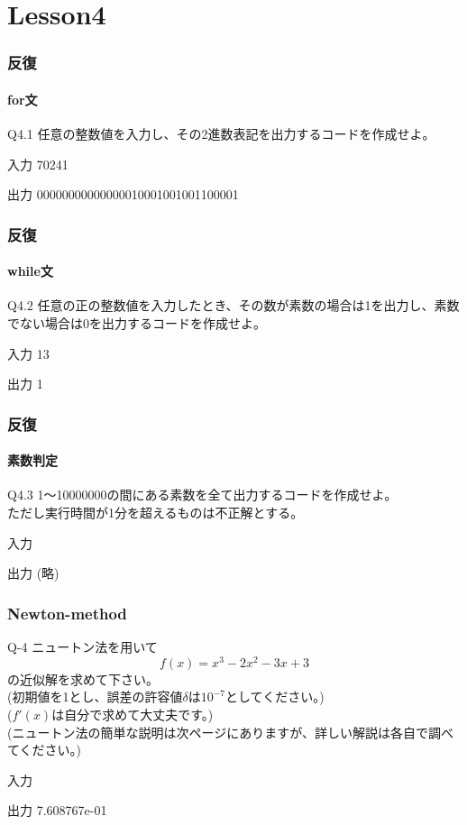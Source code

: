\documentclass[dvipdfmx]{beamer}
\begin{document}
\section{Lesson4}
\begin{frame}
    \frametitle{反復}
    \framesubtitle{for文}
	\begin{itembox}[l]{Q4.1}
        任意の整数値を入力し、その2進数表記を出力するコードを作成せよ。
	\end{itembox}
	\begin{block}{入力}
        70241
	\end{block}
	\begin{block}{出力}
        00000000000000010001001001100001
	\end{block}
\end{frame}

\begin{frame}
    \frametitle{反復}
    \framesubtitle{while文}
	\begin{itembox}[l]{Q4.2}
        任意の正の整数値を入力したとき、その数が素数の場合は1を出力し、素数でない場合は0を出力するコードを作成せよ。
	\end{itembox}
	\begin{block}{入力}
        13
	\end{block}
	\begin{block}{出力}
        1
	\end{block}
\end{frame}

\begin{frame}
    \frametitle{反復}
    \framesubtitle{素数判定}
	\begin{itembox}[l]{Q4.3}
        1～10000000の間にある素数を全て出力するコードを作成せよ。\\
        ただし実行時間が1分を超えるものは不正解とする。
	\end{itembox}
	\begin{block}{入力}
	\end{block}
	\begin{block}{出力}
        (略)
	\end{block}
\end{frame}

\begin{frame}
	\frametitle{Newton-method}
	\begin{itembox}[l]{Q-4}
		ニュートン法を用いて
		$$f(x) = x^3-2x^2-3x+3$$
		の近似解を求めて下さい。\\
		(初期値を1とし、誤差の許容値$\delta$は$10^{-7}$としてください。)\\
		($f'(x)$は自分で求めて大丈夫です。)\\
		(ニュートン法の簡単な説明は次ページにありますが、詳しい解説は各自で調べてください。)
	\end{itembox}
	\begin{block}{入力}		
	\end{block}
	\begin{block}{出力}
		7.608767e-01
	\end{block}
\end{frame}
\end{document}
